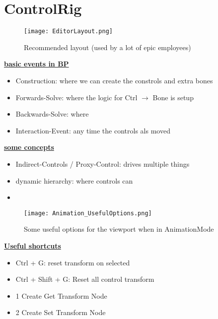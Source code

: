     \section{ControlRig}
        \begin{figure}
            \texttt{[image: EditorLayout.png]}
            \caption{Recommended layout (used by a lot of epic employees)}
            \label{}
        \end{figure}

        

        \textbf{\uline{basic events in BP}}        
        \begin{itemize}
            \item Construction: where we can create the constrols and extra bones
            \item Forwards-Solve: where the logic for Ctrl $\rightarrow$ Bone is setup
            \item Backwards-Solve: where 
            \item Interaction-Event: any time the controls als moved
        \end{itemize}
        \textbf{\uline{some concepts}}
        \begin{itemize}
            \item Indirect-Controls / Proxy-Control: drives multiple things
            \item dynamic hierarchy: where controls can
            \item 
        \end{itemize}
        
        \begin{figure}
            \texttt{[image: Animation\_UsefulOptions.png]}
            \caption{Some useful options for the viewport when in AnimationMode}
            \label{}
        \end{figure}

        \textbf{\uline{Useful shortcuts}}
        \begin{itemize}
            \item Ctrl + G: reset transform on selected
            \item Ctrl + Shift + G: Reset all control transform
            \item 1 Create Get Transform Node
            \item 2 Create Set Transform Node
        \end{itemize}

